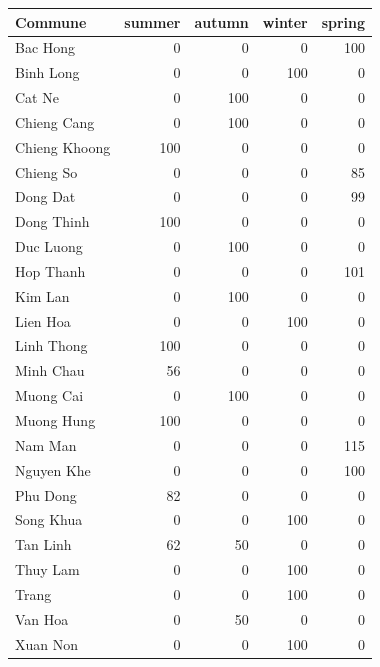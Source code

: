 \begin{frame}
\begin{table}[ht]
\centering
{\tiny%
\begin{tabular}{lrrrr}
  \toprule
Commune & summer & autumn & winter & spring \\
  \midrule
Bac Hong &   0 &   0 &   0 & 100 \\
  Binh Long &   0 &   0 & 100 &   0 \\
  Cat Ne &   0 & 100 &   0 &   0 \\
  Chieng Cang &   0 & 100 &   0 &   0 \\
  Chieng Khoong & 100 &   0 &   0 &   0 \\
  Chieng So &   0 &   0 &   0 &  85 \\
  Dong Dat &   0 &   0 &   0 &  99 \\
  Dong Thinh & 100 &   0 &   0 &   0 \\
  Duc Luong &   0 & 100 &   0 &   0 \\
  Hop Thanh &   0 &   0 &   0 & 101 \\
  Kim Lan &   0 & 100 &   0 &   0 \\
  Lien Hoa &   0 &   0 & 100 &   0 \\
  Linh Thong & 100 &   0 &   0 &   0 \\
  Minh Chau &  56 &   0 &   0 &   0 \\
  Muong Cai &   0 & 100 &   0 &   0 \\
  Muong Hung & 100 &   0 &   0 &   0 \\
  Nam Man &   0 &   0 &   0 & 115 \\
  Nguyen Khe &   0 &   0 &   0 & 100 \\
  Phu Dong &  82 &   0 &   0 &   0 \\
  Song Khua &   0 &   0 & 100 &   0 \\
  Tan Linh &  62 &  50 &   0 &   0 \\
  Thuy Lam &   0 &   0 & 100 &   0 \\
  Trang &   0 &   0 & 100 &   0 \\
  Van Hoa &   0 &  50 &   0 &   0 \\
  Xuan Non &   0 &   0 & 100 &   0 \\
   \bottomrule
\end{tabular}}
\end{table}
\end{frame}



